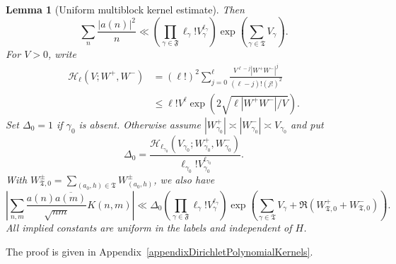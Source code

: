 \documentclass[oneside, 12pt]{amsart}
\newtheorem{lem}[thm]{Lemma}
\theoremstyle{definition}
\begin{document}
{\begin{lem}[Uniform multiblock kernel estimate]
			Then
			\begin{equation}\label{multiblockCoefficientBound}
				\sum_n\frac{|a(n)|^2}{n}
				\ll
				\left(\prod_{\gamma\in\mathfrak F}
				\ell_\gamma!V_\gamma^{\ell_\gamma}\right)
				\exp\left(\sum_{\gamma\in\mathfrak T}V_\gamma\right).
			\end{equation}
			For $V>0$, write
			\begin{equation}\label{multiblockDistinguishedHBound}
				\begin{aligned}
					\mathcal H_\ell(V;W^+,W^-)
					&=(\ell!)^2\sum_{j=0}^{\ell}
					\frac{V^{\ell-j}|W^+W^-|^j}{(\ell-j)!(j!)^2}\\
					&\leq \ell!V^\ell
					\exp\left(2\sqrt{\ell|W^+W^-|/V}\right).
				\end{aligned}
			\end{equation}
			Set $\Delta_0=1$ if $\gamma_0$ is absent.  Otherwise assume
			$|W_{\gamma_0}^+|\asymp|W_{\gamma_0}^-|\asymp V_{\gamma_0}$ and put
			\[
			\Delta_0=
			\frac{\mathcal H_{\ell_{\gamma_0}}
				(V_{\gamma_0};W_{\gamma_0}^+,W_{\gamma_0}^-)}
			{\ell_{\gamma_0}!V_{\gamma_0}^{\ell_{\gamma_0}}}.
			\]
			With $W_{\mathfrak T,0}^\pm
			=\sum_{(a_0,h)\in\mathfrak T}W_{(a_0,h)}^\pm$, we also have
			\begin{equation}\label{multiblockTwistedConclusion}
				\left|\sum_{n,m}
				\frac{a(n)\overline{a(m)}}{\sqrt{nm}}K(n,m)\right|
				\ll \Delta_0
				\left(\prod_{\gamma\in\mathfrak F}
				\ell_\gamma!V_\gamma^{\ell_\gamma}\right)
				\exp\left(
				\sum_{\gamma\in\mathfrak T}V_\gamma
				+\Re(W_{\mathfrak T,0}^++W_{\mathfrak T,0}^-)
				\right).
			\end{equation}
			All implied constants are uniform in the labels and independent of $H$.
		\end{lem}
		
		{The proof is given in
			Appendix~\ref{appendixDirichletPolynomialKernels}.}
	}
	
\end{document}
